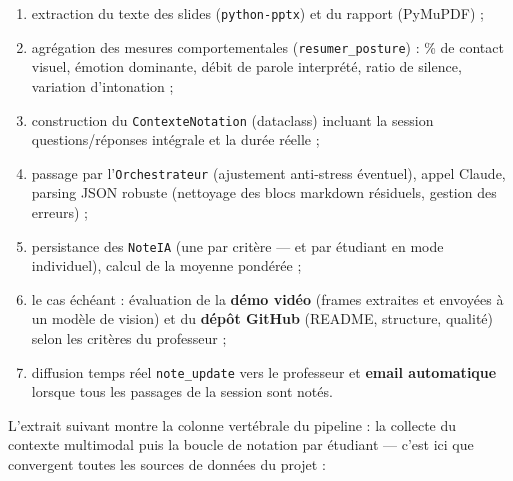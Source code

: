 \documentclass[12pt,a4paper]{report}
\begin{document}
\begin{enumerate}
  \item extraction du texte des slides (\texttt{python-pptx}) et du rapport
        (PyMuPDF) ;
  \item agrégation des mesures comportementales
        (\texttt{resumer\_posture}) : \% de contact visuel, émotion dominante,
        débit de parole interprété, ratio de silence, variation d'intonation ;
  \item construction du \texttt{ContexteNotation} (dataclass) incluant la
        session questions/réponses intégrale et la durée réelle ;
  \item passage par l'\texttt{Orchestrateur} (ajustement anti-stress
        éventuel), appel Claude, parsing JSON robuste (nettoyage des blocs
        markdown résiduels, gestion des erreurs) ;
  \item persistance des \texttt{NoteIA} (une par critère --- et par étudiant
        en mode individuel), calcul de la moyenne pondérée ;
  \item le cas échéant : évaluation de la \textbf{démo vidéo} (frames
        extraites et envoyées à un modèle de vision) et du \textbf{dépôt
        GitHub} (README, structure, qualité) selon les critères du professeur ;
  \item diffusion temps réel \texttt{note\_update} vers le professeur et
        \textbf{email automatique} lorsque tous les passages de la session
        sont notés.
\end{enumerate}

L'extrait suivant montre la colonne vertébrale du pipeline : la collecte du
contexte multimodal puis la boucle de notation par étudiant --- c'est ici que
convergent toutes les sources de données du projet :
\end{document}
